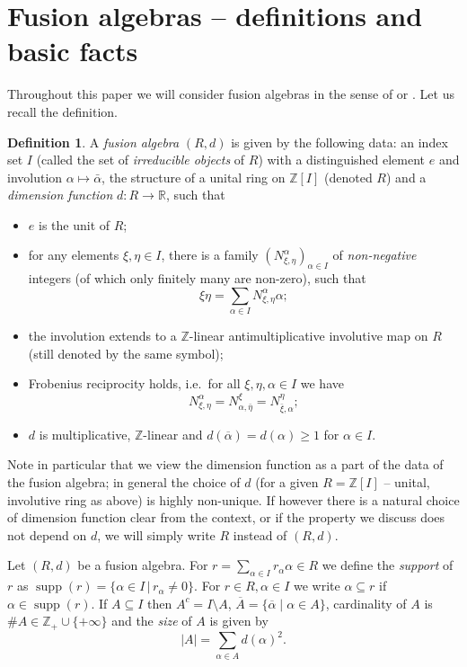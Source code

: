 \documentclass[11 pt, leqno]{amsart}
\newcommand{\ov}{\overline}
\newcommand{\RR}{\mathbb{R}}
\newcommand{\ZZ}{\mathbb{Z}}
\DeclareMathOperator{\supp}{supp}
\theoremstyle{definition}
\numberwithin{equation}{section}
\newtheorem{deft}[theorem]{Definition}
\begin{document}
\section{Fusion algebras --  definitions and basic facts}
\label{sec:fusiondef}

Throughout this paper we will consider fusion algebras in the sense of \cite{HiaiIzumi} or \cite[Definition 2.1]{Kyed}. Let us recall the definition.

\begin{deft}\label{def1}
A \emph{fusion algebra} $(R,d)$ is given by the following data: an index set $I$ (called the set of \emph{irreducible objects} of $R$) with a distinguished element $e$ and involution $\alpha \mapsto \bar{\alpha}$, the structure of a unital ring on $\ZZ[I]$ (denoted $R$)  and a \emph{dimension function} $d\colon R \to \RR$, such that
\begin{itemize}
	\item[(i)] $e$ is the unit of $R$;
	\item[(ii)] for any elements $\xi, \eta \in I$, there is a family  $(N_{\xi, \eta}^\alpha)_{\alpha \in I}$ of \emph{non-negative} integers (of which only finitely many are non-zero), such that 
	\[ \xi \eta = \sum_{\alpha \in I} N_{\xi, \eta}^\alpha \alpha;\]
	\item[(iii)] the involution extends to a $\ZZ$-linear antimultiplicative involutive map on $R$ (still denoted by the same symbol);
	\item[(iv)] Frobenius reciprocity holds, i.e.~for all $ \xi, \eta, \alpha \in I$ we have 
	\[ N_{\xi, \eta}^\alpha = N_{\alpha, \bar{\eta}}^\xi = N_{\bar{\xi}, \alpha}^\eta;\] 
	\item[(v)] $d$ is multiplicative, $\ZZ$-linear and $d(\overline{\alpha})=d(\alpha)\ge 1$ for $\alpha\in I$.
\end{itemize}
\end{deft}

Note in particular that we view the dimension function as a part of the data of the fusion algebra; in general the choice of $d$ (for a given $R=\mathbb{Z}[I]$ -- unital, involutive ring as above) is highly non-unique. If however there is a natural choice of dimension function clear from the context, or if the property we discuss does not depend on $d$, we will simply write $R$ instead of $(R,d)$.


Let $(R,d)$ be a fusion algebra.  For $r=\sum_{\alpha\in I} r_\alpha \alpha\in R$ we define the \emph{support} of $r$ as $\supp(r)=\{\alpha\in I\,|\, r_\alpha \neq 0\}$. For $r\in R, \alpha\in I$ we write $\alpha\subseteq r$ if $\alpha\in \supp(r)$. If $A\subseteq I$ then $A^c=I\setminus A$, $\ov{A}=\{\ov{\alpha}\mid \alpha\in A\}$, cardinality of $A$ is $\# A\in \ZZ_+\cup \{+\infty\}$ and the \emph{size} of $A$ is given by
\[
|A|=\sum_{\alpha\in A} d(\alpha)^2.
\]
\end{document}
